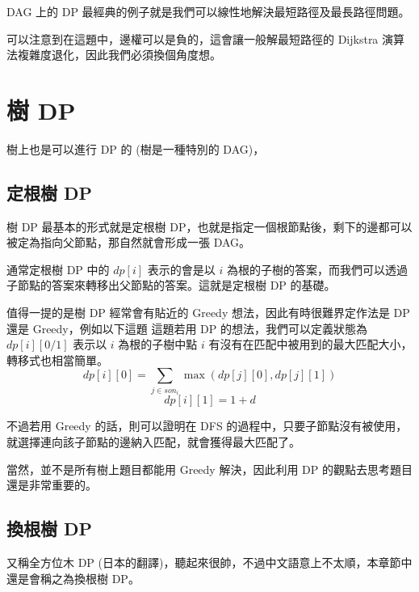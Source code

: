 \documentclass[main.tex]{subfiles}
\begin{document}
    DAG 上的 DP 最經典的例子就是我們可以線性地解決最短路徑及最長路徑問題。
    
    可以注意到在這題中，邊權可以是負的，這會讓一般解最短路徑的 Dijkstra 演算法複雜度退化，因此我們必須換個角度想。
    

\section{樹 DP}
    樹上也是可以進行 DP 的 (樹是一種特別的 DAG)，
    \subsection{定根樹 DP}
        樹 DP 最基本的形式就是定根樹 DP，也就是指定一個根節點後，剩下的邊都可以被定為指向父節點，那自然就會形成一張 DAG。
        
        通常定根樹 DP 中的 $dp[i]$ 表示的會是以 $i$ 為根的子樹的答案，而我們可以透過子節點的答案來轉移出父節點的答案。這就是定根樹 DP 的基礎。
        
        值得一提的是樹 DP 經常會有貼近的 Greedy 想法，因此有時很難界定作法是 DP 還是 Greedy，例如以下這題
        這題若用 DP 的想法，我們可以定義狀態為 $dp[i][0/1]$ 表示以 $i$ 為根的子樹中點 $i$ 有沒有在匹配中被用到的最大匹配大小，轉移式也相當簡單。
        $$dp[i][0] = \sum_{j \in son_i} \max(dp[j][0], dp[j][1])$$
        $$dp[i][1] = 1 + d$$
        
        不過若用 Greedy 的話，則可以證明在 DFS 的過程中，只要子節點沒有被使用，就選擇連向該子節點的邊納入匹配，就會獲得最大匹配了。
        
        當然，並不是所有樹上題目都能用 Greedy 解決，因此利用 DP 的觀點去思考題目還是非常重要的。
        
    \subsection{換根樹 DP}
        又稱全方位木 DP (日本的翻譯)，聽起來很帥，不過中文語意上不太順，本章節中還是會稱之為換根樹 DP。
        
\end{document}

